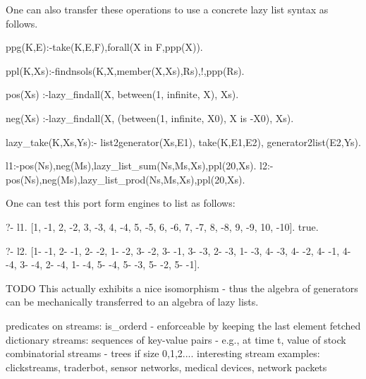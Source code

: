\documentclass{new_tlp}
\begin{document}
One can also transfer these operations to use a concrete lazy list syntax as follows.

\begin{code}

ppg(K,E):-take(K,E,F),forall(X in F,ppp(X)).

ppl(K,Xs):-findnsols(K,X,member(X,Xs),Rs),!,ppp(Rs).

pos(Xs) :-lazy_findall(X, between(1, infinite, X), Xs).

neg(Xs) :-lazy_findall(X, (between(1, infinite, X0), X is -X0), Xs).
  
lazy_take(K,Xs,Ys):-
   list2generator(Xs,E1),
   take(K,E1,E2),
   generator2list(E2,Ys).

   
l1:-pos(Ns),neg(Ms),lazy_list_sum(Ns,Ms,Xs),ppl(20,Xs).
l2:-pos(Ns),neg(Ms),lazy_list_prod(Ns,Ms,Xs),ppl(20,Xs).  
  
\end{code}

One can test this port form engines to list as follows:

\begin{codex}
?- l1.
[1, -1, 2, -2, 3, -3, 4, -4, 5, -5, 6, -6, 7, -7, 8, -8, 9, -9, 10, -10].
true.

?- l2.
[1- -1, 2- -1, 2- -2, 1- -2, 3- -2, 3- -1, 3- -3, 2- -3, 1- -3, 4- -3, 4- -2, 4- -1, 4- -4, 3- -4, 2- -4, 1- -4, 5- -4, 5- -3, 5- -2, 5- -1].
\end{codex}

{\Large TODO} This actually exhibits a nice isomorphism - thus the algebra of generators can be mechanically transferred to an algebra of lazy lists.

\BI
\I predicates on streams: is\_orderd - enforceable by keeping the last element fetched
\I dictionary streams: sequences of key-value pairs - e.g.,  at time t, value of stock
\I combinatorial streams - trees if size 0,1,2....
\I interesting stream examples: clickstreams, traderbot, sensor networks, 
medical devices, network packets
\EI
\end{document}
